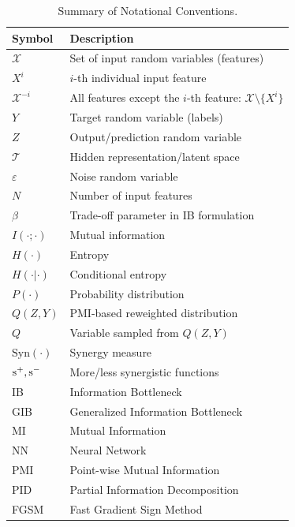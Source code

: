 \documentclass{article}
\theoremstyle{definition}
\theoremstyle{remark}
\begin{document}
\begin{table}[ht]
\centering
\caption{Summary of Notational Conventions.}
\label{tab:notation}
\begin{tabular}{@{}ll@{}}
    \toprule
    \textbf{Symbol} & \textbf{Description} \\ \midrule
    $\mathcal{X}$ & Set of input random variables (features) \\
    $X^i$ & $i$-th individual input feature \\
    $\mathcal{X}^{-i}$ & All features except the $i$-th feature: $\mathcal{X} \setminus \{X^i\}$ \\
    $Y$ & Target random variable (labels) \\
    $Z$ & Output/prediction random variable \\
    $\mathcal{T}$ & Hidden representation/latent space \\
    $\varepsilon$ & Noise random variable \\
    $N$ & Number of input features \\
    $\beta$ & Trade-off parameter in IB formulation \\
    $I(\cdot;\cdot)$ & Mutual information \\
    $H(\cdot)$ & Entropy \\
    $H(\cdot|\cdot)$ & Conditional entropy \\
    $P(\cdot)$ & Probability distribution \\
    $Q(Z,Y)$ & PMI-based reweighted distribution \\
    $Q$ & Variable sampled from $Q(Z,Y)$ \\
    $\text{Syn}(\cdot)$ & Synergy measure \\
    $\textup{s}^+, \textup{s}^-$ & More/less synergistic functions \\
    IB & Information Bottleneck \\
    GIB & Generalized Information Bottleneck \\
    MI & Mutual Information \\
    NN & Neural Network \\
    PMI & Point-wise Mutual Information \\
    PID & Partial Information Decomposition \\
    FGSM & Fast Gradient Sign Method \\
    \bottomrule
\end{tabular}
\end{table}
%
\vspace{-1cm}
\end{document}
